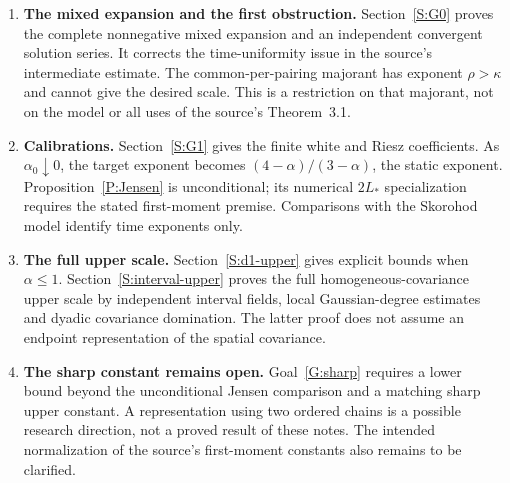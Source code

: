 \documentclass[12pt]{article}
\numberwithin{equation}{section}
\theoremstyle{definition}
\begin{document}
\begin{enumerate}[1.]
  \item \textbf{The mixed expansion and the first obstruction.}
    Section~\ref{S:G0} proves the complete nonnegative mixed expansion
    and an independent convergent solution series. It corrects the
    time-uniformity issue in the source's intermediate estimate.
    The common-per-pairing majorant has exponent $\rho>\kappa$ and cannot
    give the desired scale. This is a restriction on that majorant,
    not on the model or all uses of the source's Theorem~3.1.
  \item \textbf{Calibrations.}
    Section~\ref{S:G1} gives the finite white and Riesz coefficients.
    As $\alpha_0\downarrow0$, the target exponent becomes
    $(4-\alpha)/(3-\alpha)$, the static exponent.
    Proposition~\ref{P:Jensen} is unconditional; its numerical
    $2L_*$ specialization requires the stated first-moment premise.
    Comparisons with the Skorohod model identify time exponents only.
  \item \textbf{The full upper scale.}
    Section~\ref{S:d1-upper} gives explicit bounds when $\alpha\le1$.
    Section~\ref{S:interval-upper} proves the full homogeneous-covariance
    upper scale by independent interval fields, local Gaussian-degree
    estimates and dyadic covariance domination. The latter proof does
    not assume an endpoint representation of the spatial covariance.
  \item \textbf{The sharp constant remains open.}
    Goal~\ref{G:sharp} requires a lower bound beyond the unconditional
    Jensen comparison and a matching sharp upper constant. A representation
    using two ordered chains is a possible research direction, not a
    proved result of these notes. The intended normalization of the
    source's first-moment constants also remains to be clarified.
\end{enumerate}


\end{document}
